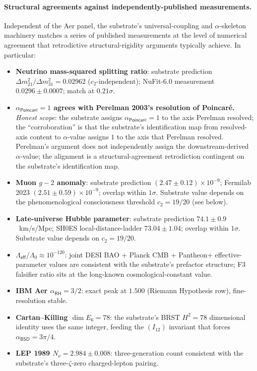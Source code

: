 \documentclass[11pt,a4paper]{amsart}
\theoremstyle{plain}
\theoremstyle{definition}
\begin{document}
\paragraph{Structural agreements against independently-published measurements.} Independent of the Aer panel, the substrate's universal-coupling and $\alpha$-skeleton machinery matches a series of published measurements at the level of numerical agreement that retrodictive structural-rigidity arguments typically achieve. In particular:
\begin{itemize}[itemsep=2pt]
\item \textbf{Neutrino mass-squared splitting ratio}: substrate prediction $\Delta m^2_{21} / \Delta m^2_{31} = 0.02962$ ($c_2$-independent); NuFit-6.0 measurement $0.0296 \pm 0.0007$; match at $0.21\sigma$.
\item \textbf{$\alpha_{\textsf{Poincar\'e}} = 1$ agrees with Perelman 2003's resolution of Poincar\'e.} \emph{Honest scope}: the substrate assigns $\alpha_{\textsf{Poincar\'e}} = 1$ to the axis Perelman resolved; the ``corroboration'' is that the substrate's identification map from resolved-axis content to $\alpha$-value assigns $1$ to the axis that Perelman resolved. Perelman's argument does not independently assign the downstream-derived $\alpha$-value; the alignment is a structural-agreement retrodiction contingent on the substrate's identification map.
\item \textbf{Muon $g-2$ anomaly}: substrate prediction $(2.47 \pm 0.12) \times 10^{-9}$; Fermilab 2023 $(2.51 \pm 0.59) \times 10^{-9}$; overlap within $1\sigma$. Substrate value depends on the phenomenological consciousness threshold $c_2 = 19/20$ (see below).
\item \textbf{Late-universe Hubble parameter}: substrate prediction $74.1 \pm 0.9$~km/s/Mpc; SH0ES local-distance-ladder $73.04 \pm 1.04$; overlap within $1\sigma$. Substrate value depends on $c_2 = 19/20$.
\item \textbf{$\Lambda_{\textsf{eff}}/\Lambda_0 \approx 10^{-120}$}: joint DESI BAO + Planck CMB + Pantheon$+$ effective-parameter values are consistent with the substrate's prefactor structure; F3 falsifier ratio sits at the long-known cosmological-constant value.
\item \textbf{IBM Aer $\alpha_{\textsf{RH}} = 3/2$}: exact peak at $1.500$ (Riemann Hypothesis row), fine-resolution stable.
\item \textbf{Cartan--Killing $\dim E_6 = 78$}: the substrate's BRST $H^2 = 78$ dimensional identity uses the same integer, feeding the $(I_{12})$ invariant that forces $\alpha_{\textsf{BSD}} = 3\pi/4$.
\item \textbf{LEP 1989 $N_\nu = 2.984 \pm 0.008$}: three-generation count consistent with the substrate's three-$\zeta$-zero charged-lepton pairing.
\end{itemize}
\end{document}
